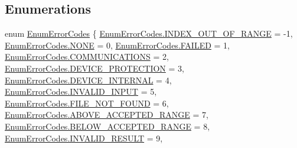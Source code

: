\subsection*{Enumerations}
\begin{DoxyCompactItemize}
\item 
enum \mbox{\hyperlink{namespace_c_s_i_1_1_library_1_1_errors_a5534735de1ef2256eb4c52c7440e30d7}{Enum\+Error\+Codes}} \{ \newline
\mbox{\hyperlink{namespace_c_s_i_1_1_library_1_1_errors_a5534735de1ef2256eb4c52c7440e30d7a577cf42cc2eae1cffef0f749c6c08787}{Enum\+Error\+Codes.\+I\+N\+D\+E\+X\+\_\+\+O\+U\+T\+\_\+\+O\+F\+\_\+\+R\+A\+N\+GE}} = -\/1, 
\mbox{\hyperlink{namespace_c_s_i_1_1_library_1_1_errors_a5534735de1ef2256eb4c52c7440e30d7ab50339a10e1de285ac99d4c3990b8693}{Enum\+Error\+Codes.\+N\+O\+NE}} = 0, 
\mbox{\hyperlink{namespace_c_s_i_1_1_library_1_1_errors_a5534735de1ef2256eb4c52c7440e30d7ab9e14d9b2886bcff408b85aefa780419}{Enum\+Error\+Codes.\+F\+A\+I\+L\+ED}} = 1, 
\mbox{\hyperlink{namespace_c_s_i_1_1_library_1_1_errors_a5534735de1ef2256eb4c52c7440e30d7a322025110415f74112e5388dab886066}{Enum\+Error\+Codes.\+C\+O\+M\+M\+U\+N\+I\+C\+A\+T\+I\+O\+NS}} = 2, 
\newline
\mbox{\hyperlink{namespace_c_s_i_1_1_library_1_1_errors_a5534735de1ef2256eb4c52c7440e30d7a971c4695cad0d47e1cd51886ec425291}{Enum\+Error\+Codes.\+D\+E\+V\+I\+C\+E\+\_\+\+P\+R\+O\+T\+E\+C\+T\+I\+ON}} = 3, 
\mbox{\hyperlink{namespace_c_s_i_1_1_library_1_1_errors_a5534735de1ef2256eb4c52c7440e30d7a6ca491b9b65e61b1e6583cb3e643879f}{Enum\+Error\+Codes.\+D\+E\+V\+I\+C\+E\+\_\+\+I\+N\+T\+E\+R\+N\+AL}} = 4, 
\mbox{\hyperlink{namespace_c_s_i_1_1_library_1_1_errors_a5534735de1ef2256eb4c52c7440e30d7ac063281d4adc16ebccfec66aa885b4dd}{Enum\+Error\+Codes.\+I\+N\+V\+A\+L\+I\+D\+\_\+\+I\+N\+P\+UT}} = 5, 
\mbox{\hyperlink{namespace_c_s_i_1_1_library_1_1_errors_a5534735de1ef2256eb4c52c7440e30d7acd54d99c8efb3c2db794197045f5b83c}{Enum\+Error\+Codes.\+F\+I\+L\+E\+\_\+\+N\+O\+T\+\_\+\+F\+O\+U\+ND}} = 6, 
\newline
\mbox{\hyperlink{namespace_c_s_i_1_1_library_1_1_errors_a5534735de1ef2256eb4c52c7440e30d7adcbd3ad09729374981c610e00b4546fc}{Enum\+Error\+Codes.\+A\+B\+O\+V\+E\+\_\+\+A\+C\+C\+E\+P\+T\+E\+D\+\_\+\+R\+A\+N\+GE}} = 7, 
\mbox{\hyperlink{namespace_c_s_i_1_1_library_1_1_errors_a5534735de1ef2256eb4c52c7440e30d7a997af939e44e12c8cb42b8f629bc2cfc}{Enum\+Error\+Codes.\+B\+E\+L\+O\+W\+\_\+\+A\+C\+C\+E\+P\+T\+E\+D\+\_\+\+R\+A\+N\+GE}} = 8, 
\mbox{\hyperlink{namespace_c_s_i_1_1_library_1_1_errors_a5534735de1ef2256eb4c52c7440e30d7aa7600947738fcac12f004f06ac14b2e9}{Enum\+Error\+Codes.\+I\+N\+V\+A\+L\+I\+D\+\_\+\+R\+E\+S\+U\+LT}} = 9, 

\end{DoxyCompactItemize}
